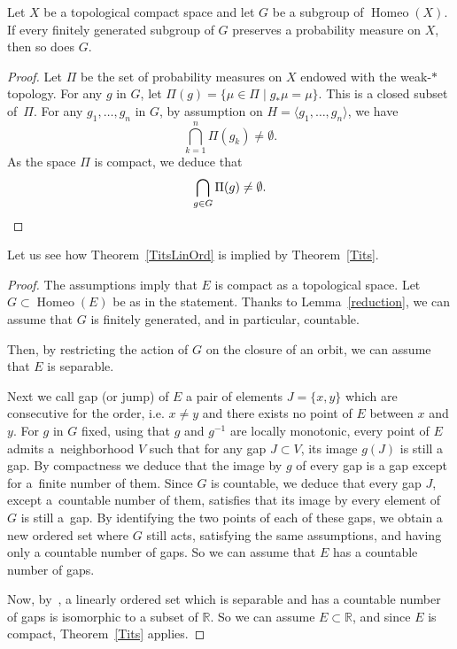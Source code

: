 \documentclass[AHL,Unicode,longabstracts,published]{cedram}
\DeclareMathOperator{\Homeo}{Homeo}
\newcommand{\R}{\mathbb{R}}
\newcommand{\R}{\mathbb{R}}
\begin{document}
\begin{lemm}\label{reduction}
Let $X$ be a topological compact space and let $G$ be a subgroup of $\Homeo(X)$. If every finitely generated subgroup of $G$ preserves a probability measure on $X$, then so does $G$.
\end{lemm}

\begin{proof}
Let $\Pi$ be the set of probability measures on $X$ endowed with the weak-$*$ topology. For any $g$ in $G$, let $\Pi(g)=\{\mu\in \Pi\mid g_*\mu=\mu\}$. This is a closed subset of~$\Pi$. For any $g_1,\dots,g_n$ in $G$, by assumption on $H=\langle g_1,\dots, g_n\rangle$, we have
\[
\bigcap_{k=1}^n \Pi(g_k)\not=\emptyset.
\]
As the space $\Pi$ is compact, we deduce that
\[
\bigcap_{g\in G} \Pi(g)\not=\emptyset.\qedhere
\]
\end{proof}

Let us see how Theorem~\ref{TitsLinOrd} is implied by Theorem~\ref{Tits}.
\begin{proof}
The assumptions imply that $E$ is compact as a topological space. Let $G\subset \Homeo(E)$ be as in the statement. Thanks to Lemma~\ref{reduction}, we can assume that $G$ is finitely generated, and in particular, countable.

Then, by restricting the action of $G$ on the closure of an orbit, we can assume that $E$ is separable.

Next we call gap (or jump) of $E$ a pair of elements $J=\{x,y\}$ which are consecutive for the order, i.e. $x\not=y$ and there exists no point of $E$ between $x$ and $y$. For $g$ in $G$ fixed, using that $g$ and $g^{-1}$ are locally monotonic, every point of $E$ admits a~neighborhood $V$ such that for any gap $J\subset V$, its image $g(J)$ is still a gap. By compactness we deduce that the image by $g$ of every gap is a gap except for a~finite number of them. Since $G$ is countable, we deduce that every gap $J$, except a~countable number of them, satisfies that its image by every element of $G$ is still a~gap. By identifying the two points of each of these gaps, we obtain a new ordered set where $G$ still acts, satisfying the same assumptions, and having only a countable number of gaps. So we can assume that $E$ has a countable number of gaps.

Now, by~\cite{F}, a linearly ordered set which is separable and has a countable number of gaps is isomorphic to a subset of $\R$. So we can assume $E\subset \R$, and since $E$ is compact, Theorem~\ref{Tits} applies.
\end{proof}
\end{document}
